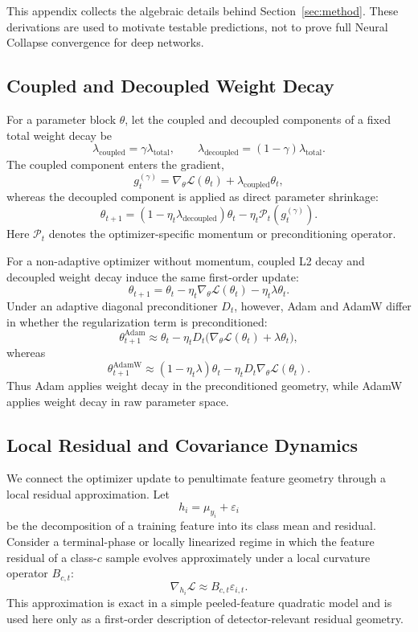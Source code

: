 This appendix collects the algebraic details behind
Section~\ref{sec:method}. These derivations are used to motivate testable
predictions, not to prove full Neural Collapse convergence for deep networks.

\subsection{Coupled and Decoupled Weight Decay}
\label{app:coupled-decoupled-derivation}

For a parameter block \(\theta\), let the coupled and decoupled components of a
fixed total weight decay be
\[
    \lambda_{\mathrm{coupled}}
    =
    \gamma\lambda_{\mathrm{total}},
    \qquad
    \lambda_{\mathrm{decoupled}}
    =
    (1-\gamma)\lambda_{\mathrm{total}}.
\]
The coupled component enters the gradient,
\[
    g_t^{(\gamma)}
    =
    \nabla_\theta \mathcal{L}(\theta_t)
    +
    \lambda_{\mathrm{coupled}}\theta_t,
\]
whereas the decoupled component is applied as direct parameter shrinkage:
\[
    \theta_{t+1}
    =
    (1-\eta_t\lambda_{\mathrm{decoupled}})\theta_t
    -
    \eta_t\mathcal{P}_t(g_t^{(\gamma)}).
\]
Here \(\mathcal{P}_t\) denotes the optimizer-specific momentum or preconditioning
operator.

For a non-adaptive optimizer without momentum, coupled L2 decay and decoupled
weight decay induce the same first-order update:
\[
    \theta_{t+1}
    =
    \theta_t-\eta_t\nabla_\theta\mathcal{L}(\theta_t)-\eta_t\lambda\theta_t.
\]
Under an adaptive diagonal preconditioner \(D_t\), however, Adam and AdamW differ
in whether the regularization term is preconditioned:
\[
    \theta_{t+1}^{\mathrm{Adam}}
    \approx
    \theta_t-\eta_tD_t\bigl(\nabla_\theta\mathcal{L}(\theta_t)+\lambda\theta_t\bigr),
\]
whereas
\[
    \theta_{t+1}^{\mathrm{AdamW}}
    \approx
    (1-\eta_t\lambda)\theta_t-\eta_tD_t\nabla_\theta\mathcal{L}(\theta_t).
\]
Thus Adam applies weight decay in the preconditioned geometry, while AdamW
applies weight decay in raw parameter space.

\subsection{Local Residual and Covariance Dynamics}
\label{app:local-residual-covariance-dynamics}

We connect the optimizer update to penultimate feature geometry through a local
residual approximation. Let
\[
    h_i = \mu_{y_i}+\varepsilon_i
\]
be the decomposition of a training feature into its class mean and residual.
Consider a terminal-phase or locally linearized regime in which the feature
residual of a class-\(c\) sample evolves approximately under a local curvature
operator \(B_{c,t}\):
\[
    \nabla_{h_i}\mathcal{L}
    \approx
    B_{c,t}\varepsilon_{i,t}.
\]
This approximation is exact in a simple peeled-feature quadratic model and is
used here only as a first-order description of detector-relevant residual
geometry.

